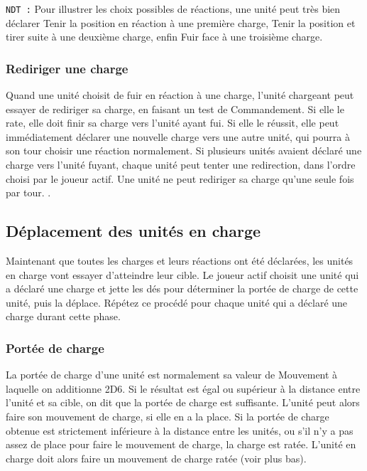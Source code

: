 \texttt{NDT :} Pour illustrer les choix possibles de réactions, une unité peut très bien déclarer Tenir la position en réaction à une première charge, Tenir la position et tirer suite à une deuxième charge, enfin Fuir face à une troisième charge.

\subsubsection*{Rediriger une charge}

Quand une unité choisit de fuir en réaction à une charge, l'unité chargeant peut essayer de rediriger sa charge, en faisant un test de Commandement. Si elle le rate, elle doit finir sa charge vers l'unité ayant fui. Si elle le réussit, elle peut immédiatement déclarer une nouvelle charge vers une autre unité, qui pourra à son tour choisir une réaction normalement. Si plusieurs unités avaient déclaré une charge vers l'unité fuyant, chaque unité peut tenter une redirection, dans l'ordre choisi par le joueur actif. Une unité ne peut rediriger sa charge qu'une seule fois par tour. .

\subsection{Déplacement des unités en charge}

Maintenant que toutes les charges et leurs réactions ont été déclarées, les unités en charge vont essayer d'atteindre leur cible. Le joueur actif choisit une unité qui a déclaré une charge et jette les dés pour déterminer la portée de charge de cette unité, puis la déplace. Répétez ce procédé pour chaque unité qui a déclaré une charge durant cette phase.

\subsubsection*{Portée de charge}

La portée de charge d'une unité est normalement sa valeur de Mouvement à laquelle on additionne 2D6. Si le résultat est égal ou supérieur à la distance entre l'unité et sa cible, on dit que la portée de charge est suffisante. L'unité peut alors faire son mouvement de charge, si elle en a la place. Si la portée de charge obtenue est strictement inférieure à la distance entre les unités, ou s'il n'y a pas assez de place pour faire le mouvement de charge, la charge est ratée. L'unité en charge doit alors faire un mouvement de charge ratée (voir plus bas).

